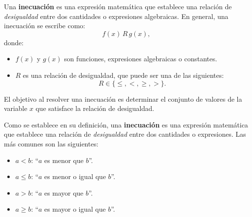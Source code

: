 \documentclass[a4,11pt]{aleph-notas}
\begin{document}
\vspace{1pt}
\begin{defi}[Inecuación]
    Una \textbf{inecuación} es una expresión matemática que establece una relación de \textit{desigualdad} entre dos cantidades o expresiones algebraicas. En general, una inecuación se escribe como:
    \[
    f(x) \, R \, g(x),
    \]
    donde:
    \begin{itemize}
        \item \( f(x) \) y \( g(x) \) son funciones, expresiones algebraicas o constantes.
        \item \( R \) es una relación de desigualdad, que puede ser una de las siguientes:
        \[
        R \in \{\leq, <, \geq, >\}.
        \]
    \end{itemize}
    El objetivo al resolver una inecuación es determinar el conjunto de valores de la variable \( x \) que satisface la relación de desigualdad.
\end{defi}


Como se establece en su definición, una \textbf{inecuación} es una expresión matemática que establece una relación de \textit{desigualdad} entre dos cantidades o expresiones. Las más comunes son las siguientes:
\begin{itemize}
    \item \( a < b \): ``\(a\) es menor que \(b\)''.
    \item \( a \leq b \): ``\(a\) es menor o igual que \(b\)''.
    \item \( a > b \): ``\(a\) es mayor que \(b\)''.
    \item \( a \geq b \): ``\(a\) es mayor o igual que \(b\)''.
\end{itemize}
\end{document}
